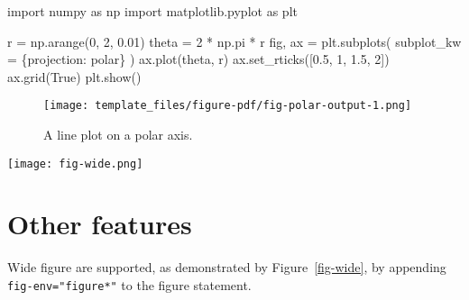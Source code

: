 \documentclass[
  10pt,
  letterpaper,
  journal,
  twoside]{IEEEtran}
\newenvironment{Shaded}{\begin{snugshade}}{\end{snugshade}}
\newcommand{\DecValTok}[1]{\textcolor[rgb]{0.68,0.00,0.00}{#1}}
\newcommand{\FloatTok}[1]{\textcolor[rgb]{0.68,0.00,0.00}{#1}}
\newcommand{\ImportTok}[1]{\textcolor[rgb]{0.00,0.46,0.62}{#1}}
\newcommand{\NormalTok}[1]{\textcolor[rgb]{0.00,0.23,0.31}{#1}}
\newcommand{\OperatorTok}[1]{\textcolor[rgb]{0.37,0.37,0.37}{#1}}
\newcommand{\StringTok}[1]{\textcolor[rgb]{0.13,0.47,0.30}{#1}}
\newcommand{\VariableTok}[1]{\textcolor[rgb]{0.07,0.07,0.07}{#1}}
\newcommand\muted[1]{%
\bgroup
\hskip0pt\color{black!40!}%
#1%
\egroup
}
\begin{document}
\begin{Shaded}
\begin{Highlighting}[]
\ImportTok{import}\NormalTok{ numpy }\ImportTok{as}\NormalTok{ np}
\ImportTok{import}\NormalTok{ matplotlib.pyplot }\ImportTok{as}\NormalTok{ plt}

\NormalTok{r }\OperatorTok{=}\NormalTok{ np.arange(}\DecValTok{0}\NormalTok{, }\DecValTok{2}\NormalTok{, }\FloatTok{0.01}\NormalTok{)}
\NormalTok{theta }\OperatorTok{=} \DecValTok{2} \OperatorTok{*}\NormalTok{ np.pi }\OperatorTok{*}\NormalTok{ r}
\NormalTok{fig, ax }\OperatorTok{=}\NormalTok{ plt.subplots(}
\NormalTok{  subplot\_kw }\OperatorTok{=}\NormalTok{ \{}\StringTok{\textquotesingle{}projection\textquotesingle{}}\NormalTok{: }\StringTok{\textquotesingle{}polar\textquotesingle{}}\NormalTok{\} }
\NormalTok{)}
\NormalTok{ax.plot(theta, r)}
\NormalTok{ax.set\_rticks([}\FloatTok{0.5}\NormalTok{, }\DecValTok{1}\NormalTok{, }\FloatTok{1.5}\NormalTok{, }\DecValTok{2}\NormalTok{])}
\NormalTok{ax.grid(}\VariableTok{True}\NormalTok{)}
\NormalTok{plt.show()}
\end{Highlighting}
\end{Shaded}

\begin{figure}[H]

{\centering \texttt{[image: template\_files/figure-pdf/fig-polar-output-1.png]}

}

\caption{\label{fig-polar}A line plot on a polar axis.}

\end{figure}

\begin{figure*}

{\centering \texttt{[image: fig-wide.png]}

}

\caption{\label{fig-wide}A wide figure spanning the two columns}

\end{figure*}

\hypertarget{sec-feature}{%
\section{Other features}\label{sec-feature}}

Wide figure are supported, as demonstrated by Figure~\ref{fig-wide}, by
appending \texttt{fig-env="figure*"} to the figure statement.

\muted{\lipsum[1]}
\end{document}
